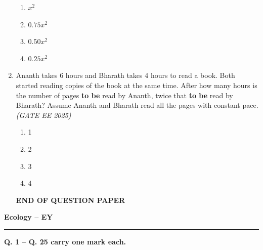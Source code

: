 \begin{enumerate}[leftmargin=*,label=\textbf{Q.\arabic*},resume]
\begin{multicols}{2}
\begin{enumerate}[label=(\Alph*)]
\item $x^2$
\item $0.75 x^2$
\item $0.50 x^2$
\item $0.25 x^2$
\end{enumerate}
\end{multicols}

\item Ananth takes 6 hours and Bharath takes 4 hours to read a book. Both started reading copies of the book at the same time. After how many hours is the number of pages \textbf{to be} read by Ananth, twice that \textbf{to be} read by Bharath? Assume Ananth and Bharath read all the pages with constant pace.\hfill \textit{(GATE EE 2025)}

\begin{multicols}{2}
\begin{enumerate}[label=(\Alph*)]
\item 1
\item 2
\item 3
\item 4
\end{enumerate}
\end{multicols}
\begin{center}
  \textbf{END OF QUESTION PAPER}  
\end{center}

\end{enumerate}
\newpage
{}

\begin{center}
    {\Large \textbf{Ecology -- EY}}
\end{center}
\rule{\linewidth}{0.4pt}
\vspace{1ex}

\noindent \textbf{Q. 1 -- Q. 25 carry one mark each.}

